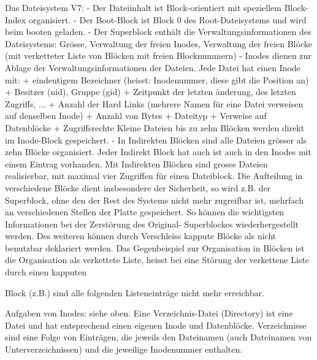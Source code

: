 \begin{answer}
Das Dateisystem V7:
- Der Dateiinhalt ist Block-orientiert mit speziellem Block-Index organisiert.
- Der Boot-Block ist Block 0 des Root-Dateisystems und wird beim booten geladen.
- Der Superblock enthält die Verwaltungsinformationen des Dateisystems: Grösse, Verwaltung der
freien Inodes, Verwaltung der freien Blöcke (mit verketteter Liste von Blöcken mit freien Blocknummern)
- Inodes dienen zur Ablage der Verwaltungsinformationen der Dateien. Jede Datei hat einen Inode
mit:
+ eindeutigem Bezeichner (heisst: Inodenummer, diese gibt die Position an)
+ Besitzer (nid), Gruppe (gid)
+ Zeitpunkt der letzten änderung, des letzten Zugriffs, ...
+ Anzahl der Hard Links (mehrere Namen für eine Datei verweisen auf denselben Inode)
+ Anzahl von Bytes
+ Dateityp
+ Verweise auf Datenblöcke
+ Zugriffsrechte
Kleine Dateien bis zu zehn Blöcken werden direkt im Inode-Block gespeichert.
- In Indirekten Blöcken sind alle Dateien grösser als zehn Blöcke organisiert. Jeder Indirekt Block
hat auch ist auch in den Inodes mit einem Eintrag vorhanden. Mit Indirekten Blöcken sind grosse
Dateien realisierbar, mit maximal vier Zugriffen für einen Dateiblock.
Die Aufteilung in verschiedene Blöcke dient insbesondere der Sicherheit, so wird z.B. der Superblock,
ohne den der Rest des Systems nicht mehr zugreifbar ist, mehrfach an verschiedenen Stellen
der Platte gespeichert. So können die wichtigsten Informationen bei der Zerstörung des Original-
Superblockes wiederhergestellt werden. Des weiteren können durch Verschleiss kappute Blöcke als
nicht benutzbar deklariert werden. Das Gegenbeispiel zur Organisation in Blöcken ist die Organisation
als verkettete Liste, heisst bei eine Störung der verkettene Liste durch einen kapputen

Block (z.B.) sind alle folgenden Listeneinträge nicht mehr erreichbar.
\end{answer}

\begin{answer}
Aufgaben von Inodes: siehe oben. Eine Verzeichnis-Datei (Directory) ist eine Datei und hat entsprechend
einen eigenen Inode und Datenblöcke. Verzeichnisse sind eine Folge von Einträgen, die
jeweils den Dateinamen (auch Dateinamen von Unterverzeichnissen) und die jeweilige Inodenummer
enthalten.
\end{answer}

